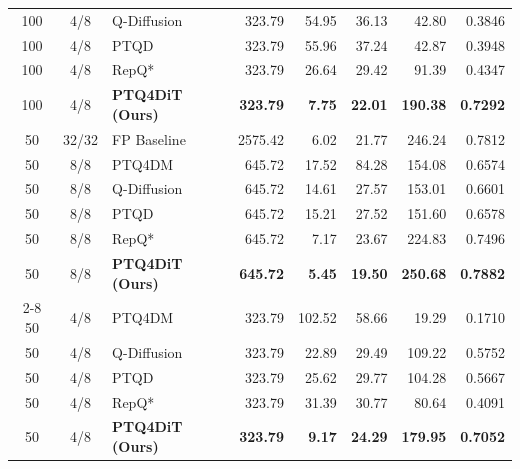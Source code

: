 \documentclass[10pt,a4paper]{article}
\begin{document}
\begin{table}[htbp]
{\begin{tabular}{@{}cc l r r r r r@{}}
100 & 4/8 & Q-Diffusion & 323.79 & 54.95 & 36.13 & 42.80 & 0.3846 \\
100 & 4/8 & PTQD & 323.79 & 55.96 & 37.24 & 42.87 & 0.3948 \\
100 & 4/8 & RepQ* & 323.79 & 26.64 & 29.42 & 91.39 & 0.4347 \\
100 & 4/8 & \textbf{PTQ4DiT (Ours)} & \textbf{323.79} & \textbf{7.75} & \textbf{22.01} & \textbf{190.38} & \textbf{0.7292} \\
\midrule
50 & 32/32 & FP Baseline & 2575.42 & 6.02 & 21.77 & 246.24 & 0.7812 \\
50 & 8/8 & PTQ4DM & 645.72 & 17.52 & 84.28 & 154.08 & 0.6574 \\
50 & 8/8 & Q-Diffusion & 645.72 & 14.61 & 27.57 & 153.01 & 0.6601 \\
50 & 8/8 & PTQD & 645.72 & 15.21 & 27.52 & 151.60 & 0.6578 \\
50 & 8/8 & RepQ* & 645.72 & 7.17 & 23.67 & 224.83 & 0.7496 \\
50 & 8/8 & \textbf{PTQ4DiT (Ours)} & \textbf{645.72} & \textbf{5.45} & \textbf{19.50} & \textbf{250.68} & \textbf{0.7882} \\
\cmidrule(lr){2-8}
50 & 4/8 & PTQ4DM & 323.79 & 102.52 & 58.66 & 19.29 & 0.1710 \\
50 & 4/8 & Q-Diffusion & 323.79 & 22.89 & 29.49 & 109.22 & 0.5752 \\
50 & 4/8 & PTQD & 323.79 & 25.62 & 29.77 & 104.28 & 0.5667 \\
50 & 4/8 & RepQ* & 323.79 & 31.39 & 30.77 & 80.64 & 0.4091 \\
50 & 4/8 & \textbf{PTQ4DiT (Ours)} & \textbf{323.79} & \textbf{9.17} & \textbf{24.29} & \textbf{179.95} & \textbf{0.7052} \\
\bottomrule
\end{tabular}%
}
\end{table}
\end{document}
